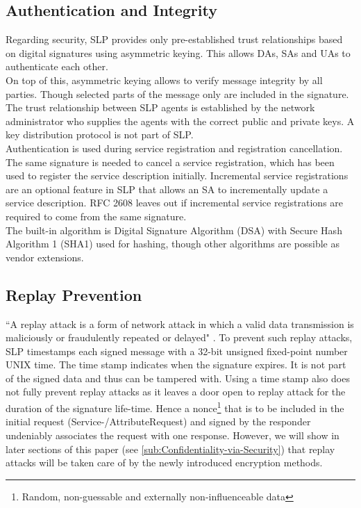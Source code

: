 \subsection{Authentication and Integrity\label{sub:Authentication-and-Integrity}}
Regarding security, SLP provides only pre-established trust relationships based on digital signatures using asymmetric keying. This allows DAs, SAs and UAs to authenticate each other.\\
On top of this, asymmetric keying allows to verify message integrity by all parties. Though selected parts of the message only are included in the signature.\\
The trust relationship between SLP agents is established by the network administrator who supplies the agents with the correct public and private keys. A key distribution protocol is not part of SLP.\\
Authentication is used during service registration and registration cancellation. The same signature is needed to cancel a service registration, which has been used to register the service description initially. Incremental service registrations are an optional feature in SLP that allows an SA to incrementally update a service description. RFC 2608 leaves out if incremental service registrations are required to come from the same signature.\\
The built-in algorithm is Digital Signature Algorithm (DSA) \citep{Kravitz1993} with Secure Hash Algorithm 1 (SHA1) \citep{Eastlake3rd2001} used for hashing, though other algorithms are possible as vendor extensions.

\subsection{Replay Prevention\label{sub:Replay-Prevention}}
``A replay attack is a form of network attack in which a valid data transmission is maliciously or fraudulently repeated or delayed" \citep{Wikipedia2009}. To prevent such replay attacks, SLP timestamps each signed message with a 32-bit unsigned fixed-point number UNIX time. The time stamp indicates when the signature expires. It is not part of the signed data and thus can be tampered with. Using a time stamp also does not fully prevent replay attacks as it leaves a door open to replay attack for the duration of the signature life-time. Hence a nonce\footnote{Random, non-guessable and externally non-influenceable data} that is to be included in the initial request (Service-/AttributeRequest) and signed by the responder undeniably associates the request with one response. However, we will show in later sections of this paper (see \ref{sub:Confidentiality-via-Security}) that replay attacks will be taken care of by the newly introduced encryption methods.

